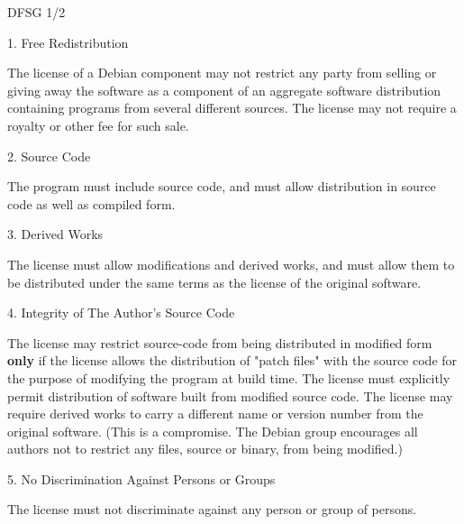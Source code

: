 \documentclass[cjk,dvipdfmx,12pt]{beamer}
\begin{document}
\begin{frame}{DFSG 1/2}

 {\scriptsize

     1. Free Redistribution

       The license of a Debian component may not restrict any party from
       selling or giving away the software as a component of an aggregate
       software distribution containing programs from several different
       sources. The license may not require a royalty or other fee for
       such sale.

    2. Source Code

       The program must include source code, and must allow distribution
       in source code as well as compiled form.

    3. Derived Works

       The license must allow modifications and derived works, and must
       allow them to be distributed under the same terms as the license
       of the original software.

    4. Integrity of The Author's Source Code

       The license may restrict source-code from being distributed in
       modified form {\bf only} if the license allows the distribution of
       "patch files" with the source code for the purpose of modifying
       the program at build time. The license must explicitly permit
       distribution of software built from modified source code. The
       license may require derived works to carry a different name or
       version number from the original software. (This is a compromise.
       The Debian group encourages all authors not to restrict any files,
       source or binary, from being modified.)

    5. No Discrimination Against Persons or Groups

       The license must not discriminate against any person or group of
       persons.

}
\end{frame}
\end{document}
